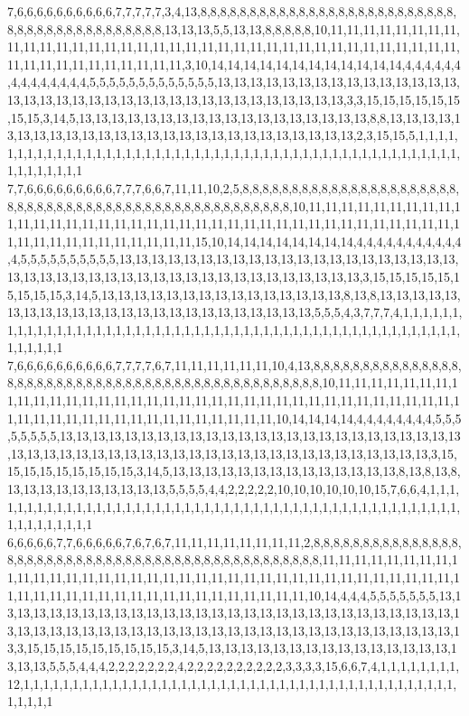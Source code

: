 7,6,6,6,6,6,6,6,6,6,6,7,7,7,7,7,3,4,13,8,8,8,8,8,8,8,8,8,8,8,8,8,8,8,8,8,8,8,8,8,8,8,8,8,8,8,8,8,8,8,8,8,8,8,8,8,8,8,8,8,8,13,13,13,5,5,13,13,8,8,8,8,8,10,11,11,11,11,11,11,11,11,11,11,11,11,11,11,11,11,11,11,11,11,11,11,11,11,11,11,11,11,11,11,11,11,11,11,11,11,11,11,11,11,11,11,11,11,11,11,11,3,10,14,14,14,14,14,14,14,14,14,14,14,14,4,4,4,4,4,4,4,4,4,4,4,4,4,4,5,5,5,5,5,5,5,5,5,5,5,5,5,13,13,13,13,13,13,13,13,13,13,13,13,13,13,13,13,13,13,13,13,13,13,13,13,13,13,13,13,13,13,13,13,13,13,13,13,3,3,15,15,15,15,15,15,15,15,3,14,5,13,13,13,13,13,13,13,13,13,13,13,13,13,13,13,13,13,13,8,8,13,13,13,13,13,13,13,13,13,13,13,13,13,13,13,13,13,13,13,13,13,13,13,13,13,13,2,3,15,15,5,1,1,1,1,1,1,1,1,1,1,1,1,1,1,1,1,1,1,1,1,1,1,1,1,1,1,1,1,1,1,1,1,1,1,1,1,1,1,1,1,1,1,1,1,1,1,1,1,1,1,1,1,1,1,1,1,1,1
7,7,6,6,6,6,6,6,6,6,6,7,7,7,6,6,7,11,11,10,2,5,8,8,8,8,8,8,8,8,8,8,8,8,8,8,8,8,8,8,8,8,8,8,8,8,8,8,8,8,8,8,8,8,8,8,8,8,8,8,8,8,8,8,8,8,8,8,8,8,8,8,8,10,11,11,11,11,11,11,11,11,11,11,11,11,11,11,11,11,11,11,11,11,11,11,11,11,11,11,11,11,11,11,11,11,11,11,11,11,11,11,11,11,11,11,11,11,11,11,11,11,11,15,10,14,14,14,14,14,14,14,14,4,4,4,4,4,4,4,4,4,4,4,4,5,5,5,5,5,5,5,5,5,5,13,13,13,13,13,13,13,13,13,13,13,13,13,13,13,13,13,13,13,13,13,13,13,13,13,13,13,13,13,13,13,13,13,13,13,13,13,13,13,13,13,13,13,3,15,15,15,15,15,15,15,15,15,3,14,5,13,13,13,13,13,13,13,13,13,13,13,13,13,13,13,8,13,8,13,13,13,13,13,13,13,13,13,13,13,13,13,13,13,13,13,13,13,13,13,13,13,13,5,5,5,4,3,7,7,7,4,1,1,1,1,1,1,1,1,1,1,1,1,1,1,1,1,1,1,1,1,1,1,1,1,1,1,1,1,1,1,1,1,1,1,1,1,1,1,1,1,1,1,1,1,1,1,1,1,1,1,1,1,1,1,1,1,1,1
7,6,6,6,6,6,6,6,6,6,6,7,7,7,7,6,7,11,11,11,11,11,11,10,4,13,8,8,8,8,8,8,8,8,8,8,8,8,8,8,8,8,8,8,8,8,8,8,8,8,8,8,8,8,8,8,8,8,8,8,8,8,8,8,8,8,8,8,8,8,8,8,8,10,11,11,11,11,11,11,11,11,11,11,11,11,11,11,11,11,11,11,11,11,11,11,11,11,11,11,11,11,11,11,11,11,11,11,11,11,11,11,11,11,11,11,11,11,11,11,11,11,11,11,11,11,10,14,14,14,14,4,4,4,4,4,4,4,4,5,5,5,5,5,5,5,5,13,13,13,13,13,13,13,13,13,13,13,13,13,13,13,13,13,13,13,13,13,13,13,13,13,13,13,13,13,13,13,13,13,13,13,13,13,13,13,13,13,13,13,13,13,13,13,13,13,13,13,3,15,15,15,15,15,15,15,15,15,3,14,5,13,13,13,13,13,13,13,13,13,13,13,13,13,13,8,13,8,13,8,13,13,13,13,13,13,13,13,13,13,5,5,5,5,4,4,2,2,2,2,2,10,10,10,10,10,10,15,7,6,6,4,1,1,1,1,1,1,1,1,1,1,1,1,1,1,1,1,1,1,1,1,1,1,1,1,1,1,1,1,1,1,1,1,1,1,1,1,1,1,1,1,1,1,1,1,1,1,1,1,1,1,1,1,1,1,1,1,1,1
6,6,6,6,6,7,7,6,6,6,6,6,7,6,7,6,7,11,11,11,11,11,11,11,11,2,8,8,8,8,8,8,8,8,8,8,8,8,8,8,8,8,8,8,8,8,8,8,8,8,8,8,8,8,8,8,8,8,8,8,8,8,8,8,8,8,8,8,8,8,8,8,8,11,11,11,11,11,11,11,11,11,11,11,11,11,11,11,11,11,11,11,11,11,11,11,11,11,11,11,11,11,11,11,11,11,11,11,11,11,11,11,11,11,11,11,11,11,11,11,11,11,11,11,11,11,11,11,10,14,4,4,4,5,5,5,5,5,5,5,13,13,13,13,13,13,13,13,13,13,13,13,13,13,13,13,13,13,13,13,13,13,13,13,13,13,13,13,13,13,13,13,13,13,13,13,13,13,13,13,13,13,13,13,13,13,13,13,13,13,13,13,13,13,13,13,13,13,3,15,15,15,15,15,15,15,15,15,3,14,5,13,13,13,13,13,13,13,13,13,13,13,13,13,13,13,13,13,13,5,5,5,4,4,4,2,2,2,2,2,2,2,4,2,2,2,2,2,2,2,2,2,2,3,3,3,3,15,6,6,7,4,1,1,1,1,1,1,1,1,12,1,1,1,1,1,1,1,1,1,1,1,1,1,1,1,1,1,1,1,1,1,1,1,1,1,1,1,1,1,1,1,1,1,1,1,1,1,1,1,1,1,1,1,1,1,1,1,1,1
